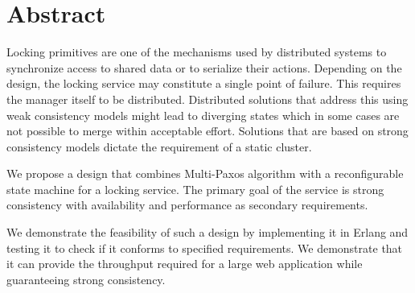 \chapter{Abstract}

Locking primitives are one of the mechanisms used by distributed systems
to synchronize access to shared data or to serialize their actions. Depending
on the design, the locking service may constitute
a single point of failure. This requires the manager itself to be
distributed. Distributed solutions that address this using weak consistency
models might lead to diverging states which in some cases are not possible to
merge within acceptable effort. Solutions that are based on strong
consistency models dictate the requirement of a static cluster.

We propose a design that combines Multi-Paxos algorithm with a
reconfigurable state machine for a locking service. The primary goal of
the service is strong consistency with availability and performance as
secondary requirements.

We demonstrate the feasibility of such a design by implementing it
in Erlang and testing it to check if it conforms to specified requirements.
We demonstrate that it can provide the throughput required for a large
web application while guaranteeing strong consistency.
